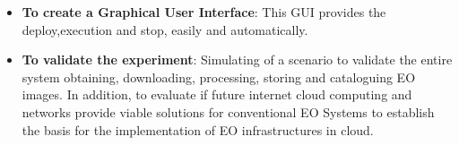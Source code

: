 \begin{itemize}
\item {\textbf{To create a Graphical User Interface}: This \ac{GUI} provides
  the deploy,execution and stop, easily and automatically.}

\item {\textbf{To validate the experiment}: Simulating of a scenario to validate the
  entire system obtaining, downloading, processing, storing and cataloguing
  \ac{EO} images. In addition,  to evaluate if future internet cloud computing
  and networks provide viable solutions for conventional \ac{EO}
  Systems to establish the basis for the implementation of \ac{EO}
  infrastructures in
  cloud. }

\end{itemize}
